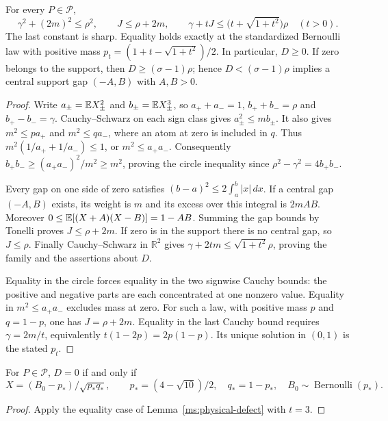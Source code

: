 \begin{lemma}
\label{ms:physical-defect}
\label{ms:fourier:afcore:lem:physical-defect}
For every $P\in\mathcal P$,
\begin{equation}
 \gamma^2+(2m)^2\le\rho^2,\qquad J\le\rho+2m,
 \qquad \gamma+tJ\le\bigl(t+\sqrt{1+t^2}\bigr)\rho\quad(t>0).
 \label{ms:gap-family}
\end{equation}
The last constant is sharp. Equality holds exactly at the standardized
Bernoulli law with positive mass $p_t=(1+t-\sqrt{1+t^2})/2$.
In particular, $D\ge0$. If zero belongs to the support, then
$D\ge(\sigma-1)\rho$; hence $D<(\sigma-1)\rho$ implies a central
support gap $(-A,B)$ with $A,B>0$.
\end{lemma}
\begin{proof}
Write $a_\pm=\mathbb E X_\pm^2$ and $b_\pm=\mathbb E X_\pm^3$, so
$a_++a_-=1$, $b_++b_-=\rho$ and $b_+-b_-=\gamma$.
Cauchy--Schwarz on each sign class gives
$a_\pm^2\le mb_\pm$. It also gives
$m^2\le pa_+$ and $m^2\le qa_-$, where an atom at zero is included
in $q$. Thus
$m^2(1/a_++1/a_-)\le1$, or $m^2\le a_+a_-$.
Consequently $b_+b_-\ge(a_+a_-)^2/m^2\ge m^2$, proving the
circle inequality since $\rho^2-\gamma^2=4b_+b_-$.

Every gap on one side of zero satisfies
$(b-a)^2\le2\int_a^b|x|\,dx$.
If a central gap $(-A,B)$ exists, its weight is $m$ and its excess
over this integral is $2mAB$. Moreover
$0\le\mathbb E[(X+A)(X-B)]=1-AB$.
Summing the gap bounds by Tonelli proves $J\le\rho+2m$.
If zero is in the support there is no central gap, so $J\le\rho$.
Finally Cauchy--Schwarz in $\mathbb R^2$ gives
$\gamma+2tm\le\sqrt{1+t^2}\rho$, proving the family and the
assertions about $D$.

Equality in the circle forces equality in the two signwise Cauchy
bounds: the positive and negative parts are each concentrated at one
nonzero value. Equality in $m^2\le a_+a_-$ excludes mass at zero.
For such a law, with positive mass $p$ and $q=1-p$, one has
$J=\rho+2m$. Equality in the last Cauchy bound requires
$\gamma=2m/t$, equivalently $t(1-2p)=2p(1-p)$.
Its unique solution in $(0,1)$ is the stated $p_t$.
\end{proof}

\begin{corollary}\label{ms:zero-defect}
For $P\in\mathcal P$, $D=0$ if and only if
\[
 X=(B_0-p_*)/\sqrt{p_*q_*},\qquad
 p_*=(4-\sqrt{10})/2,\quad q_*=1-p_*,
 \quad B_0\sim\operatorname{Bernoulli}(p_*).
\]
\end{corollary}
\begin{proof}
Apply the equality case of Lemma~\ref{ms:physical-defect} with $t=3$.
\end{proof}


